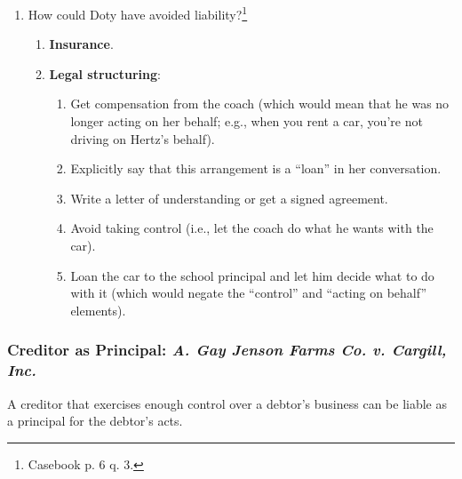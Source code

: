 \begin{enumerate}
\begin{enumerate}
        request, instruction or command.''\footnote{Casebook p. 5.} (In other 
        words, there should not be a presumption that the owner of the car is 
        the principal and that the driver is his agent.)
    \end{enumerate}
    \item How could Doty have avoided liability?\footnote{Casebook p. 6 q. 3.}
    \begin{enumerate}
        \item \textbf{Insurance}.
        \item \textbf{Legal structuring}:
        \begin{enumerate}
            \item Get compensation from the coach (which would mean that he 
            was no longer acting on her behalf; e.g., when you rent a car, 
            you're not driving on Hertz's behalf).
            \item Explicitly say that this arrangement is a ``loan'' in her 
            conversation.
            \item Write a letter of understanding or get a signed agreement.
            \item Avoid taking control (i.e., let the coach do what he wants 
            with the car).
            \item Loan the car to the school principal and let him decide what 
            to do with it (which would negate the ``control'' and ``acting on 
            behalf'' elements).
        \end{enumerate}
    \end{enumerate}
\end{enumerate}

\subsubsection{Creditor as Principal: \emph{A. Gay Jenson Farms Co. v. 
Cargill, Inc.}}
\label{subsub:cargill}

A creditor that exercises enough control over a debtor's business can be 
liable as a principal for the debtor's acts.

